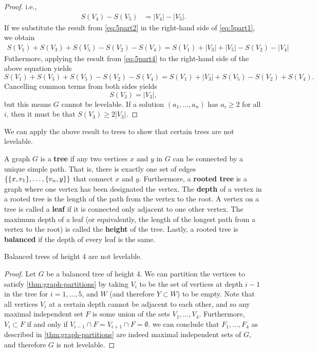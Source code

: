 \begin{proof}
i.e.,
\begin{equation} \label{eq:5part4}
\begin{aligned}
S(V_4) - S(V_5) &=  |V_4| - |V_5|.
\end{aligned}
\end{equation}
If we substitute the result from \eqref{eq:5part2} in the right-hand side of \eqref{eq:5part1}, we obtain
\begin{equation*}
\begin{aligned}
S(V_1) + S(V_3) + S(V_5) - S(V_2) - S(V_4) = S(V_1) + |V_3| + |V_5| - S(V_2) - |V_4|
\end{aligned}
\end{equation*}
Futhermore, applying the result from \eqref{eq:5part4} to the right-hand side of the above equation yields
$$
S(V_1) + S(V_3) + S(V_5) - S(V_2) - S(V_4) = S(V_1) + |V_3| + S(V_5) - S(V_2) + S(V_4).
$$
Cancelling common terms from both sides yields
$$
S(V_3) = |V_3|,
$$
but this means $G$ cannot be levelable. If a solution $(a_1, \dots, a_n)$ has $a_i \geq 2$ for all $i$, then it must be that $S(V_3) \geq 2 |V_3|$. 
\end{proof}
\noindent
We can apply the above result to trees to show that certain trees are not levelable. 

\begin{definition}
A graph $G$ is a \textbf{tree} if any two vertices $x$ and $y$ in $G$ can be connected by a unique simple path. That is, there is exactly one set of edges $\{ \{ x, v_1 \}, \dots, \{ v_n, y \} \}$ that connect $x$ and $y$. Furthermore, a \textbf{rooted tree} is a graph where one vertex has been designated the vertex. The \textbf{depth} of a vertex in a rooted tree is the length of the path from the vertex to the root. A vertex on a tree is called a \textbf{leaf} if it is connected only adjacent to one other vertex. The maximum depth of a leaf (or equivalently, the length of the longest path from a vertex to the root) is called the \textbf{height} of the tree. Lastly, a rooted tree is \textbf{balanced} if the depth of every leaf is the same.
\end{definition}

\begin{corollary} \label{cor:balanced-4-tree}
Balanced trees of height 4 are not levelable.
\end{corollary}
\begin{proof}
Let $G$ be a balanced tree of height 4. We can partition the vertices to satisfy \autoref{thm:graph-partitions} by taking $V_i$ to be the set of vertices at depth $i-1$ in the tree for $i = 1, \dots, 5$, and $W$ (and therefore $Y \subset W$) to be empty. Note that all vertices $V_i$ at a certain depth cannot be adjacent to each other, and so any maximal independent set $F$ is some union of the sets $V_1, \dots, V_4$. Furthermore, $V_i \subset F$ if and only if $V_{i-1} \cap F = V_{i+1} \cap F = \emptyset$. we can conclude that $F_1, \dots, F_4$ as described in \autoref{thm:graph-partitions} are indeed maximal independent sets of $G$, and therefore $G$ is not levelable.
\end{proof}

